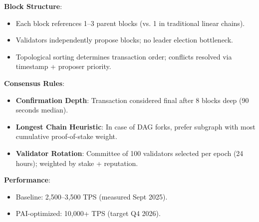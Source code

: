 \documentclass[11pt]{article}
\begin{document}
\textbf{Block Structure}:
\begin{itemize}[noitemsep]
  \item Each block references 1--3 parent blocks (vs. 1 in traditional linear chains).
  \item Validators independently propose blocks; no leader election bottleneck.
  \item Topological sorting determines transaction order; conflicts resolved via timestamp + proposer priority.
\end{itemize}

\textbf{Consensus Rules}:
\begin{itemize}[noitemsep]
  \item \textbf{Confirmation Depth}: Transaction considered final after 8 blocks deep (90 seconds median).
  \item \textbf{Longest Chain Heuristic}: In case of DAG forks, prefer subgraph with most cumulative proof-of-stake weight.
  \item \textbf{Validator Rotation}: Committee of 100 validators selected per epoch (24 hours); weighted by stake + reputation.
\end{itemize}

\textbf{Performance}:
\begin{itemize}[noitemsep]
  \item Baseline: 2,500--3,500 TPS (measured Sept 2025).
  \item PAI-optimized: 10,000+ TPS (target Q4 2026).
\end{itemize}
\end{document}
